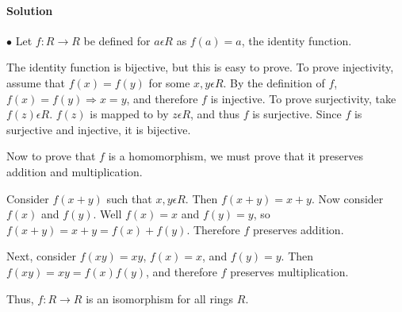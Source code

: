\documentclass[a4paper,11pt]{article}
\begin{document}
\paragraph{Solution}  
$\bullet$ Let $f: R \rightarrow R$ be defined for $a \epsilon R$ as  $f(a) = a$, the identity function. 

The identity function is bijective, but this is easy to prove. To prove injectivity, assume that $f(x) = f(y)$ for some $x,y \epsilon R$. By the definition of $f$, $f(x) = f(y) \Rightarrow x = y$, and therefore $f$ is injective. To prove surjectivity, take $f(z) \epsilon R$. $f(z)$ is mapped to by $z \epsilon R$, and thus $f$ is surjective. Since $f$ is surjective and injective, it is bijective.

Now to prove that $f$ is a homomorphism, we must prove that it preserves addition and multiplication. 

Consider $f(x + y)$ such that $x,y \epsilon R$. Then $f(x+y) = x + y$. Now consider $f(x)$ and $f(y)$. Well $f(x) = x$ and $f(y) = y$, so $f(x+y) = x + y = f(x) + f(y)$. Therefore $f$ preserves addition.

Next, consider $f(xy) = xy$, $f(x) = x$, and $f(y) = y$. Then $f(xy) = xy = f(x)f(y)$, and therefore $f$ preserves multiplication.

Thus, $f: R \rightarrow R$ is an isomorphism for all rings $R$.
\end{document}
